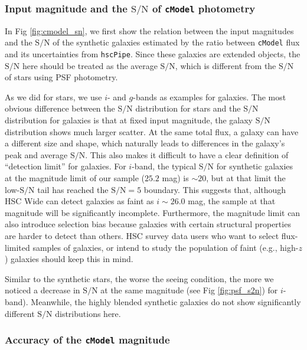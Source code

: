 \documentclass[useamsfonts]{pasj01}
\def\hscpipe{\texttt{hscPipe}}
\def\cmodel{\texttt{cModel}}
\def\s2n{{$\mathrm{S}/\mathrm{N}$}}
\begin{document}
\subsubsection{Input magnitude and the \s2n{} of \cmodel{} photometry}

    In Fig \ref{fig:cmodel_sn}, we first show the relation between the input
    magnitudes and the \s2n{} of the synthetic galaxies estimated by the ratio
    between \cmodel{} flux and its uncertainties from \hscpipe{}.
    Since these galaxies are extended objects, the \s2n{} here should be treated
    as the average \s2n{}, which is different from the \s2n{} of stars using PSF
    photometry.

    As we did for stars, we use $i$- and $g$-bands as examples for galaxies.
    The most obvious difference between the  \s2n{} distribution for stars and the  \s2n{} distribution for galaxies is that
    at fixed input magnitude, the galaxy \s2n{} distribution shows much larger
    scatter.
    At the same total flux, a galaxy can have a different size and shape, which
    naturally leads to differences in the galaxy's peak and average \s2n{}.
    This also makes it difficult to have a clear definition of ``detection limit''
    for galaxies.
    For $i$-band, the typical \s2n{} for synthetic galaxies at the magnitude limit
    of our sample ($25.2$ mag) is ${\sim}20$, but at that limit the low-\s2n{} tail has
    reached the \s2n{}$=5$ boundary.
    This suggests that, although HSC Wide can detect galaxies as faint as
    $i{\sim}26.0$ mag, the sample at that magnitude will be significantly incomplete.
    Furthermore, the magnitude limit can also introduce selection bias because galaxies with certain structural properties are harder to detect than others.
    HSC survey data users who want to select flux-limited samples of galaxies,
    or intend to study the population of faint (e.g., high-$z$) galaxies should
    keep this in mind.

    Similar to the synthetic stars, the worse the seeing condition, the more
    we noticed a decrease in \s2n{} at the same magnitude (see Fig \ref{fig:psf_s2n}) 
    for $i$-band).
    Meanwhile, the highly blended synthetic galaxies do not show significantly
    different \s2n{} distributions here.

\subsubsection{Accuracy of the \cmodel{} magnitude}
\end{document}
